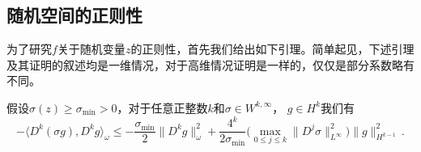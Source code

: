 \subsection{随机空间的正则性}

为了研究$f$关于随机变量$z$的正则性，首先我们给出如下引理。简单起见，下述引理及其证明的叙述均是一维情况，对于高维情况证明是一样的，仅仅是部分系数略有不同。
\begin{lem}\label{rg:lemma}
  假设$\sigma(z)\ge \sigma_{\mathrm{min}}>0$，对于任意正整数$k$和$\sigma\in W^{k,\infty}$， $g\in H^k$我们有
  \begin{equation}
    -\langle D^k (\sigma g), D^k g\rangle_\omega \le -\frac{\sigma_{\mathrm{min}}}{2}\|D^k g\|^2_\omega + \frac{4^k}{2\sigma_{\mathrm{min}}}\big(\max\limits_{0\le j\le k}\|D^j \sigma\|^2_{L^\infty}\big)\|g\|_{H^{k-1}}^2\,.
  \end{equation}
\end{lem}
